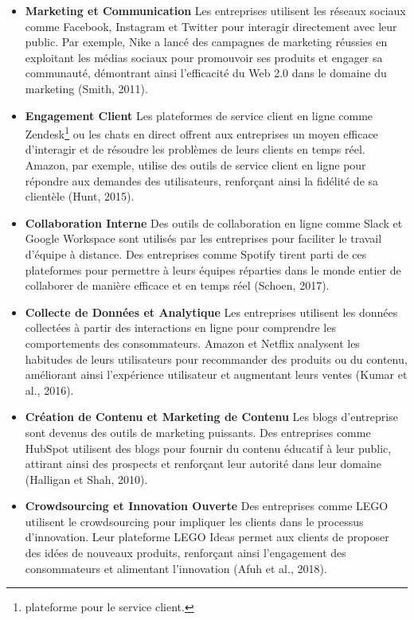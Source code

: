 \documentclass[12pt,a4paper]{article} %
\begin{document}
			\begin{itemize}
				\item \textbf{Marketing et Communication}
	Les entreprises utilisent les réseaux sociaux comme Facebook, Instagram et Twitter pour interagir directement avec leur public. Par exemple, Nike a lancé des campagnes de marketing réussies en exploitant les médias sociaux pour promouvoir ses produits et engager sa communauté, démontrant ainsi l'efficacité du Web 2.0 dans le domaine du marketing (Smith, 2011).
		\item \textbf{Engagement Client}
	Les plateformes de service client en ligne comme Zendesk\footnote[7]{plateforme pour le service client.} ou les chats en direct offrent aux entreprises un moyen efficace d'interagir et de résoudre les problèmes de leurs clients en temps réel. Amazon, par exemple, utilise des outils de service client en ligne pour répondre aux demandes des utilisateurs, renforçant ainsi la fidélité de sa clientèle (Hunt, 2015).
	\item \textbf{Collaboration Interne}
	Des outils de collaboration en ligne comme Slack et Google Workspace sont utilisés par les entreprises pour faciliter le travail d'équipe à distance. Des entreprises comme Spotify tirent parti de ces plateformes pour permettre à leurs équipes réparties dans le monde entier de collaborer de manière efficace et en temps réel (Schoen, 2017).
	\item \textbf{Collecte de Données et Analytique}
	Les entreprises utilisent les données collectées à partir des interactions en ligne pour comprendre les comportements des consommateurs. Amazon et Netflix analysent les habitudes de leurs utilisateurs pour recommander des produits ou du contenu, améliorant ainsi l'expérience utilisateur et augmentant leurs ventes (Kumar et al., 2016).
	\item \textbf{Création de Contenu et Marketing de Contenu}
	Les blogs d'entreprise sont devenus des outils de marketing puissants. Des entreprises comme HubSpot utilisent des blogs pour fournir du contenu éducatif à leur public, attirant ainsi des prospects et renforçant leur autorité dans leur domaine (Halligan et Shah, 2010).
	\item\textbf{Crowdsourcing et Innovation Ouverte}
	Des entreprises comme LEGO utilisent le crowdsourcing pour impliquer les clients dans le processus d'innovation. Leur plateforme LEGO Ideas permet aux clients de proposer des idées de nouveaux produits, renforçant ainsi l'engagement des consommateurs et alimentant l'innovation (Afuh et al., 2018).

\end{itemize}
\end{document}
